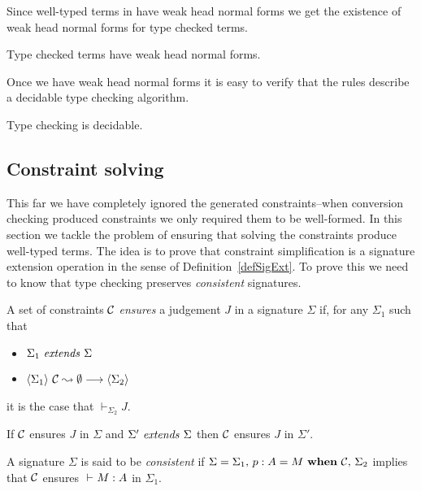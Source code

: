 Since well-typed terms in {\Core} have weak head normal forms we get the
existence of weak head normal forms for type checked terms.

\begin{corollary}
    Type checked terms have weak head normal forms.
\end{corollary}

Once we have weak head normal forms it is easy to verify that the rules
describe a decidable type checking algorithm.

\begin{corollary}
    Type checking is decidable.
\end{corollary}

\subsection{Constraint solving}

This far we have completely ignored the generated constraints--when conversion
checking produced constraints we only required them to be well-formed. In this
section we tackle the problem of ensuring that solving the constraints produce
well-typed terms. The idea is to prove that constraint simplification is a
signature extension operation in the sense of Definition~\ref{defSigExt}. To
prove this we need to know that type checking preserves {\em consistent}
signatures.

\begin{definition}[Ensures] \label{defEnsures}
    A set of constraints $\mathcal{C}$ {\em ensures} a judgement $J$ in a signature
    $\Sigma$ if, for any $\Sigma_1$ such that
    \begin{itemize}
	\item ${\Sigma_1} ~ \mathit{extends} ~ {\Sigma}$
	\item $\langle {\Sigma_1} \rangle ~ {{\mathcal{C}} \leadsto {\emptyset}} \longrightarrow \langle {\Sigma_2} \rangle$
    \end{itemize}
    it is the case that $\vdash_{\Sigma_2} J$.
\end{definition}

\begin{lemma} \label{lemExtendEnsures}
    If $\mathcal{C}$ ensures $J$ in $\Sigma$ and ${\Sigma'} ~ \mathit{extends} ~ {\Sigma}$ then $\mathcal{C}$
    ensures $J$ in $\Sigma'$.
\end{lemma}

\begin{definition} \label{defConsistentSig}
    A signature $\Sigma$ is said to be {\em consistent} if $\Sigma = {\Sigma_1},\,{} {{p} : {A} = {M} ~\mathbf{when}~ {\mathcal{C}}},\,{} \Sigma_2$ implies that $\mathcal{C}$ ensures
    ${} \vdash_{} {M} : {A}$ in $\Sigma_1$.
\end{definition}

